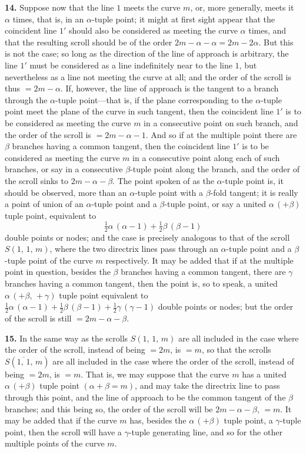 \documentclass[11pt,a4paper]{article}
\begin{document}
\textbf{14.} Suppose now that the line $1$ meets the curve $m$, or, more generally, meets it $\alpha$ times, that is, in an $\alpha$-tuple point; it might at first sight appear that the coincident line $1'$ should also be considered as meeting the curve $\alpha$ times, and that the resulting scroll should be of the order $2m - \alpha - \alpha = 2m - 2\alpha$. But this is not the case; so long as the direction of the line of approach is arbitrary, the line $1'$ must be considered as a line indefinitely near to the line $1$, but nevertheless as a line not meeting the curve at all; and the order of the scroll is thus $= 2m - \alpha$. If, however, the line of approach is the tangent to a branch through the $\alpha$-tuple point---that is, if the plane corresponding to the $\alpha$-tuple point meet the plane of the curve in such tangent, then the coincident line $1'$ is to be considered as meeting the curve $m$ in a consecutive point on such branch, and the order of the scroll is $= 2m - \alpha - 1$. And so if at the multiple point there are $\beta$ branches having a common tangent, then the coincident line $1'$ is to be considered as meeting the curve $m$ in a consecutive point along each of such branches, or say in a consecutive $\beta$-tuple point along the branch, and the order of the scroll sinks to $2m - \alpha - \beta$. The point spoken of as the $\alpha$-tuple point is, it should be observed, more than an $\alpha$-tuple point with a $\beta$-fold tangent; it is really a point of union of an $\alpha$-tuple point and a $\beta$-tuple point, or say a united $\alpha\,(+\beta)$ tuple point, equivalent to
\[
\tfrac{1}{2}\alpha\,(\alpha - 1) + \tfrac{1}{2}\beta\,(\beta - 1)
\]
double points or nodes; and the case is precisely analogous to that of the scroll $S(1,\,1,\,m)$, where the two directrix lines pass through an $\alpha$-tuple point and a $\beta$-tuple point of the curve $m$ respectively. It may be added that if at the multiple point in question, besides the $\beta$ branches having a common tangent, there are $\gamma$ branches having a common tangent, then the point is, so to speak, a united $\alpha\,(+\beta,\,+\gamma)$ tuple point equivalent to $\tfrac{1}{2}\alpha\,(\alpha - 1) + \tfrac{1}{2}\beta\,(\beta - 1) + \tfrac{1}{2}\gamma\,(\gamma - 1)$ double points or nodes; but the order of the scroll is still $= 2m - \alpha - \beta$.

\medskip

\textbf{15.} In the same way as the scrolls $S(1,\,1,\,m)$ are all included in the case where the order of the scroll, instead of being $= 2m$, is $= m$, so that the scrolls $S(\overline{1,\,1},\,m)$ are all included in the case where the order of the scroll, instead of being $= 2m$, is $= m$. That is, we may suppose that the curve $m$ has a united $\alpha\,(+\beta)$ tuple point $(\alpha + \beta = m)$, and may take the directrix line to pass through this point, and the line of approach to be the common tangent of the $\beta$ branches; and this being so, the order of the scroll will be $2m - \alpha - \beta$, $= m$. It may be added that if the curve $m$ has, besides the $\alpha\,(+\beta)$ tuple point, a $\gamma$-tuple point, then the scroll will have a $\gamma$-tuple generating line, and so for the other multiple points of the curve $m$.
\end{document}
